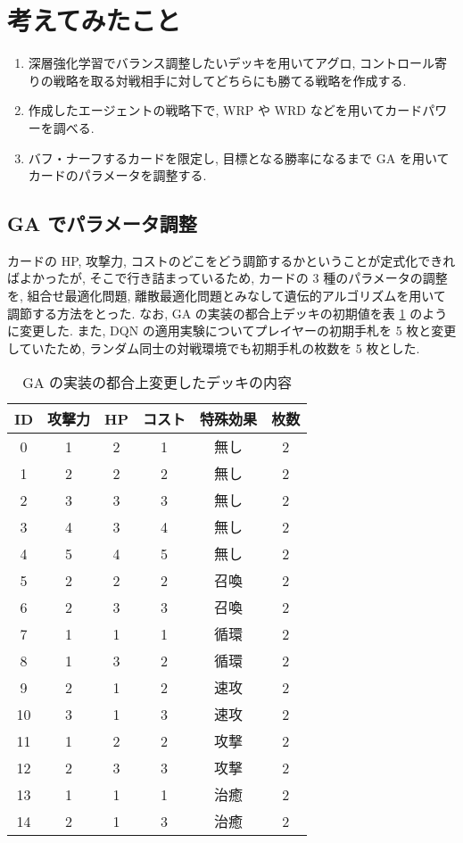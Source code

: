 \documentclass{jarticle}     %
\begin{document}
\section{考えてみたこと}
\begin{enumerate}
  \item 深層強化学習でバランス調整したいデッキを用いてアグロ, コントロール寄りの戦略を取る対戦相手に対してどちらにも勝てる戦略を作成する.
  \item 作成したエージェントの戦略下で, WRP や WRD などを用いてカードパワーを調べる.
  \item バフ・ナーフするカードを限定し, 目標となる勝率になるまで GA を用いてカードのパラメータを調整する.
\end{enumerate}

\subsection{GA でパラメータ調整}
カードの HP, 攻撃力, コストのどこをどう調節するかということが定式化できればよかったが, そこで行き詰まっているため, カードの 3 種のパラメータの調整を, 組合せ最適化問題, 離散最適化問題とみなして遺伝的アルゴリズムを用いて調節する方法をとった.
なお, GA の実装の都合上デッキの初期値を表 \ref{table:Redeck} のように変更した. また, DQN の適用実験についてプレイヤーの初期手札を 5 枚と変更していたため, ランダム同士の対戦環境でも初期手札の枚数を 5 枚とした.

\begin{table}[h]
  \centering
  \caption{GA の実装の都合上変更したデッキの内容}
  \label{table:Redeck}
  \begin{tabular}{|c|c|c|c|c|c|}
  \hline
  ID & 攻撃力 & HP & コスト & 特殊効果 & 枚数 \\ \hline
  0 & 1 & 2 & 1 & 無し & 2 \\ \hline
  1 & 2 & 2 & 2 & 無し & 2 \\ \hline
  2 & 3 & 3 & 3 & 無し & 2 \\ \hline
  3 & 4 & 3 & 4 & 無し & 2 \\ \hline
  4 & 5 & 4 & 5 & 無し & 2 \\ \hline
  5 & 2 & 2 & 2 & 召喚 & 2 \\ \hline
  6 & 2 & 3 & 3 & 召喚 & 2 \\ \hline
  7 & 1 & 1 & 1 & 循環 & 2 \\ \hline
  8 & 1 & 3 & 2 & 循環 & 2 \\ \hline
  9 & 2 & 1 & 2 & 速攻 & 2 \\ \hline
  10 & 3 & 1 & 3 & 速攻 & 2 \\ \hline
  11 & 1 & 2 & 2 & 攻撃 & 2 \\ \hline
  12 & 2 & 3 & 3 & 攻撃 & 2 \\ \hline
  13 & 1 & 1 & 1 & 治癒 & 2 \\ \hline
  14 & 2 & 1 & 3 & 治癒 & 2 \\ \hline
  \end{tabular}
  \end{table}
\end{document}
